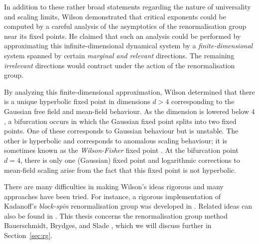 In addition to these rather broad statements regarding the nature of universality
and scaling limits, Wilson demonstrated that critical exponents could be computed
by a careful analysis of the asymptotics of the renormalisation group near its
fixed points. He claimed that such an analysis could be performed by approximating
this infinite-dimensional dynamical system by a \emph{finite-dimensional} system
spanned by certain \emph{marginal and relevant} directions. The remaining \emph{irrelevant}
directions would contract under the action of the renormalisation group.

By analyzing this finite-dimensional approximation, Wilson determined that there
is a unique hyperbolic fixed point in dimensions $d > 4$ corresponding to the Gaussian
free field and mean-field behaviour. As the dimension is lowered below $4$, a
bifurcation occurs in which the Gaussian fixed point splits into two fixed points.
One of these corresponds to Gaussian behaviour but is unstable. The other is hyperbolic and
corresponds to anomalous scaling behaviour; it is sometimes known as the
\emph{Wilson-Fisher} fixed point \cite{WF72}. At the bifurcation point $d = 4$, there is only
one (Gaussian) fixed point and logarithmic corrections to mean-field scaling arise
from the fact that this fixed point is not hyperbolic.

There are many difficulties in making Wilson's ideas rigorous and many approaches
have been tried. For instance, a rigorous implementation of Kadanoff's \emph{block-spin}
renormalisation group was developed in \cite{GK85}. Related ideas can also be found in
\cite{GJ87,FMRS87}. This thesis concerns the renormalisation group method Bauerschmidt,
Brydges, and Slade \cite{BS-rg-norm,BS-rg-loc,BBS-rg-pt,BS-rg-IE,BS-rg-step}, which we
will discuss further in Section~\ref{sec:rg}.

